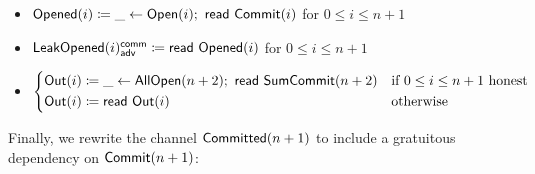 \begin{itemize}
\item {\color{red} $\mathsf{Opened}(i) \coloneqq \_ \leftarrow \mathsf{Open}(i); \ \mathsf{read} \ \mathsf{Commit}(i)$ for $0 \leq i \leq n+1$}
\item {\color{red} $\mathsf{LeakOpened}(i)^{\mathsf{comm}}_{\mathsf{adv}} \coloneqq \mathsf{read} \ \mathsf{Opened}(i)$ for $0 \leq i \leq n+1$}
\item $\begin{cases*} \Out(i) \coloneqq \_ \leftarrow \AllOpen(n+2); \ \read{\SumCommit(n+2)} & \text{if $0 \leq i \leq n+1$ honest} \\ \Out(i) \coloneqq \read{\Out(i)} & \text{otherwise} \end{cases*}$
\end{itemize}

\noindent Finally, we rewrite the channel $\mathsf{Committed}(n+1)$ to include a gratuitous dependency on $\mathsf{Commit}(n+1)$:

